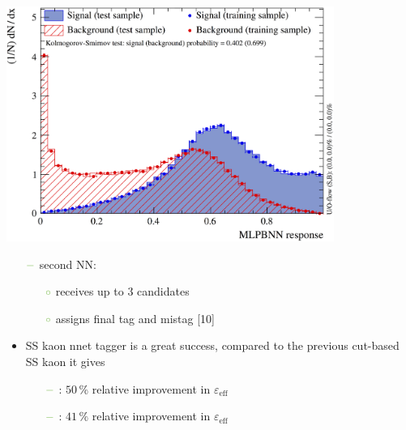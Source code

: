 {\begin{minipage}{0.474\boxwidth}
\begin{itemize}
\begin{flushleft}
\includegraphics[width=0.802\textwidth]{figures/sskaonNnetfirstNN3.png}
\end{flushleft}

\vspace{-2.9em}

\setlength\itemsep{0.01em}
\setlength{\itemindent}{-.11in}
\begin{itemize}
\setlength{\itemindent}{-.11in}
\item[${\color{tu_gruen}-}$] second NN:
\begin{itemize}
\item[${\color{tu_gruen}\circ}$] receives up to 3 candidates 
\item[${\color{tu_gruen}\circ}$] assigns final tag and mistag [10]
\end{itemize}
\end{itemize}
\end{itemize}
\begin{itemize}
\setlength\itemsep{0.01em}
\item SS kaon nnet tagger is a great success, compared \newline to the previous cut-based SS kaon it gives  
\begin{itemize}
\setlength{\itemindent}{-.11in}
\vspace{-0.5em}
\item[${\color{tu_gruen}-}$] \BsToDspi: $50\,\%$ relative improvement in $\varepsilon_{\text{eff}}$
\item[${\color{tu_gruen}-}$] \BsToJPsiPhi: $41\,\%$ relative improvement in $\varepsilon_{\text{eff}}$
\end{itemize}
\end{itemize}
\vspace{-0.1em}
\vspace{-0.75em}
\end{minipage}
}




